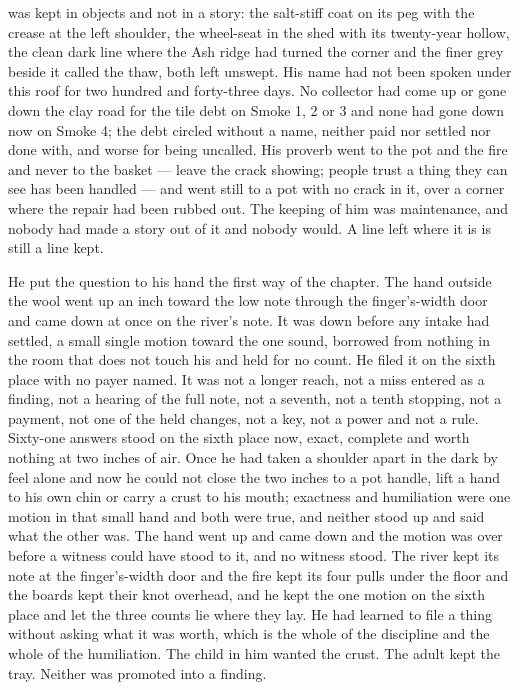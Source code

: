  was kept in objects and not in a story: the salt-stiff coat on its peg with the crease at the left shoulder, the wheel-seat in the shed with its twenty-year hollow, the clean dark line where the Ash ridge had turned the corner and the finer grey beside it called the thaw, both left unswept. His name had not been spoken under this roof for two hundred and forty-three days. No collector had come up or gone down the clay road for the tile debt on Smoke 1, 2 or 3 and none had gone down now on Smoke 4; the debt circled without a name, neither paid nor settled nor done with, and worse for being uncalled. His proverb went to the pot and the fire and never to the basket --- leave the crack showing; people trust a thing they can see has been handled --- and went still to a pot with no crack in it, over a corner where the repair had been rubbed out. The keeping of him was maintenance, and nobody had made a story out of it and nobody would. A line left where it is is still a line kept.

\scenebreak

He put the question to his hand the first way of the chapter. The hand outside the wool went up an inch toward the low note through the finger's-width door and came down at once on the river's note. It was down before any intake had settled, a small single motion toward the one sound, borrowed from nothing in the room that does not touch his and held for no count. He filed it on the sixth place with no payer named. It was not a longer reach, not a miss entered as a finding, not a hearing of the full note, not a seventh, not a tenth stopping, not a payment, not one of the held changes, not a key, not a power and not a rule. Sixty-one answers stood on the sixth place now, exact, complete and worth nothing at two inches of air. Once he had taken a shoulder apart in the dark by feel alone and now he could not close the two inches to a pot handle, lift a hand to his own chin or carry a crust to his mouth; exactness and humiliation were one motion in that small hand and both were true, and neither stood up and said what the other was. The hand went up and came down and the motion was over before a witness could have stood to it, and no witness stood. The river kept its note at the finger's-width door and the fire kept its four pulls under the floor and the boards kept their knot overhead, and he kept the one motion on the sixth place and let the three counts lie where they lay. He had learned to file a thing without asking what it was worth, which is the whole of the discipline and the whole of the humiliation. The child in him wanted the crust. The adult kept the tray. Neither was promoted into a finding.

